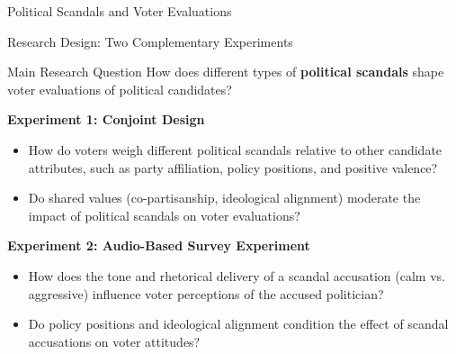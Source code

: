 \documentclass[9pt, aspectratio=169]{beamer}
\newcommand{\customcite}[1]{\textcolor{blue}{\footnotesize\parencite{#1}}}
\begin{document}
\begin{section} {Political Scandals and Voter Evaluations}

\begin{frame}{Research Design: Two Complementary Experiments}

\begin{block}{Main Research Question}  
\centering How does different types of \textbf{political scandals} shape voter evaluations of political candidates? 
\end{block}
\vspace{0.3cm}

\textbf{Experiment 1: Conjoint Design} \customcite{hainmueller2014}  
\begin{itemize}
    \item How do voters weigh different political scandals relative to other candidate attributes, such as party affiliation, policy positions, and positive valence?
    \item Do shared values (co-partisanship, ideological alignment) moderate the impact of political scandals on voter evaluations?
\end{itemize}
\vspace{0.2cm}
\textbf{Experiment 2: Audio-Based Survey Experiment}  
\begin{itemize}
    \item How does the tone and rhetorical delivery of a scandal accusation (calm vs. aggressive) influence voter perceptions of the accused politician?
    \item Do policy positions and ideological alignment condition the effect of scandal accusations on voter attitudes?
\end{itemize} 
\end{frame}


\end{section}
\end{document}
